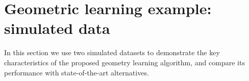 \documentclass[twoside]{article}
\begin{document}
 
 \section{Geometric learning example: simulated data}
 \label{sec:DataAnalysis}
 
In this section we use two simulated datasets to demonstrate the key 
characteristics of the proposed geometry learning algorithm, and compare 
its performance with state-of-the-art alternatives.  



%
%
%



\end{document}
